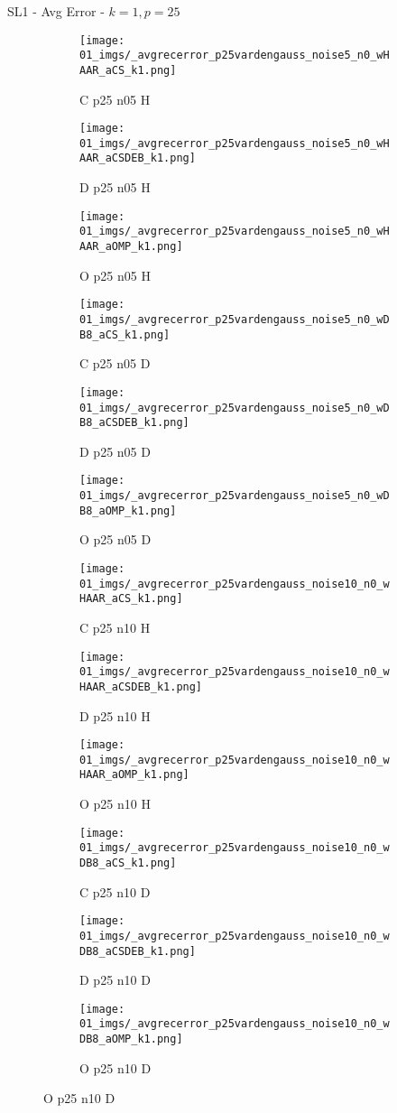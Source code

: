 \begin{frame}{SL1 - Avg Error - $k=1,p=25$}{}
\begin{figure}
\begin{subfigure}{0.13\textwidth}
\texttt{[image: 01\_imgs/\_avgrecerror\_p25vardengauss\_noise5\_n0\_wHAAR\_aCS\_k1.png]}
\caption*{\tiny C p25 n05 H}
\end{subfigure}
\begin{subfigure}{0.13\textwidth}
\texttt{[image: 01\_imgs/\_avgrecerror\_p25vardengauss\_noise5\_n0\_wHAAR\_aCSDEB\_k1.png]}
\caption*{\tiny D p25 n05 H}
\end{subfigure}
\begin{subfigure}{0.13\textwidth}
\texttt{[image: 01\_imgs/\_avgrecerror\_p25vardengauss\_noise5\_n0\_wHAAR\_aOMP\_k1.png]}
\caption*{\tiny O p25 n05 H}
\end{subfigure}
\begin{subfigure}{0.13\textwidth}
\texttt{[image: 01\_imgs/\_avgrecerror\_p25vardengauss\_noise5\_n0\_wDB8\_aCS\_k1.png]}
\caption*{\tiny C p25 n05 D}
\end{subfigure}
\begin{subfigure}{0.13\textwidth}
\texttt{[image: 01\_imgs/\_avgrecerror\_p25vardengauss\_noise5\_n0\_wDB8\_aCSDEB\_k1.png]}
\caption*{\tiny D p25 n05 D}
\end{subfigure}
\begin{subfigure}{0.13\textwidth}
\texttt{[image: 01\_imgs/\_avgrecerror\_p25vardengauss\_noise5\_n0\_wDB8\_aOMP\_k1.png]}
\caption*{\tiny O p25 n05 D}
\end{subfigure}

\vspace{5pt}

\begin{subfigure}{0.13\textwidth}
\texttt{[image: 01\_imgs/\_avgrecerror\_p25vardengauss\_noise10\_n0\_wHAAR\_aCS\_k1.png]}
\caption*{\tiny C p25 n10 H}
\end{subfigure}
\begin{subfigure}{0.13\textwidth}
\texttt{[image: 01\_imgs/\_avgrecerror\_p25vardengauss\_noise10\_n0\_wHAAR\_aCSDEB\_k1.png]}
\caption*{\tiny D p25 n10 H}
\end{subfigure}
\begin{subfigure}{0.13\textwidth}
\texttt{[image: 01\_imgs/\_avgrecerror\_p25vardengauss\_noise10\_n0\_wHAAR\_aOMP\_k1.png]}
\caption*{\tiny O p25 n10 H}
\end{subfigure}
\begin{subfigure}{0.13\textwidth}
\texttt{[image: 01\_imgs/\_avgrecerror\_p25vardengauss\_noise10\_n0\_wDB8\_aCS\_k1.png]}
\caption*{\tiny C p25 n10 D}
\end{subfigure}
\begin{subfigure}{0.13\textwidth}
\texttt{[image: 01\_imgs/\_avgrecerror\_p25vardengauss\_noise10\_n0\_wDB8\_aCSDEB\_k1.png]}
\caption*{\tiny D p25 n10 D}
\end{subfigure}
\begin{subfigure}{0.13\textwidth}
\texttt{[image: 01\_imgs/\_avgrecerror\_p25vardengauss\_noise10\_n0\_wDB8\_aOMP\_k1.png]}
\caption*{\tiny O p25 n10 D}
\end{subfigure}


\end{figure}
\end{frame}
